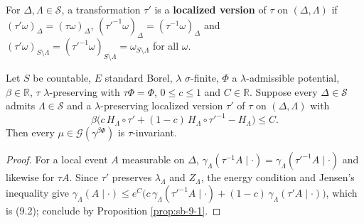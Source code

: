 \begin{definition}
    \label{def:sb-localized}
    \leanok

    For $\Delta, \Lambda \in \mathcal S$, a transformation $\tau'$ is a \textbf{localized version}
    of $\tau$ on $(\Delta, \Lambda)$ if $(\tau'\omega)_\Delta = (\tau\omega)_\Delta$,
    $(\tau'^{-1}\omega)_\Delta = (\tau^{-1}\omega)_\Delta$ and
    $(\tau'\omega)_{S \setminus \Lambda} = (\tau'^{-1}\omega)_{S \setminus \Lambda}
    = \omega_{S \setminus \Lambda}$ for all $\omega$.
\end{definition}

\begin{theorem}[Georgii (9.3)]
    \label{thm:sb-9-3}
    \leanok

    Let $S$ be countable, $E$ standard Borel, $\lambda$ $\sigma$-finite, $\Phi$ a
    $\lambda$-admissible potential, $\beta \in \mathbb R$, $\tau$ $\lambda$-preserving with
    $\tau\Phi = \Phi$, $0 \leq c \leq 1$ and $C \in \mathbb R$. Suppose every $\Delta \in \mathcal S$
    admits $\Lambda \in \mathcal S$ and a $\lambda$-preserving localized version $\tau'$ of
    $\tau$ on $(\Delta, \Lambda)$ with
    \[
        \beta\bigl(c\, H_\Lambda \circ \tau' + (1-c)\, H_\Lambda \circ \tau'^{-1} - H_\Lambda\bigr)
        \leq C .
    \]
    Then every $\mu \in \mathcal G(\gamma^{\beta\Phi})$ is $\tau$-invariant.
\end{theorem}
\begin{proof}
    \leanok
    For a local event $A$ measurable on $\Delta$, $\gamma_\Lambda(\tau^{-1}A \mid \cdot)
    = \gamma_\Lambda(\tau'^{-1}A \mid \cdot)$ and likewise for $\tau A$. Since $\tau'$ preserves
    $\lambda_\Lambda$ and $Z_\Lambda$, the energy condition and Jensen's inequality give
    $\gamma_\Lambda(A \mid \cdot) \leq e^{C}\bigl(c\,\gamma_\Lambda(\tau'^{-1}A \mid \cdot)
    + (1-c)\,\gamma_\Lambda(\tau' A \mid \cdot)\bigr)$, which is (9.2); conclude by Proposition
    \ref{prop:sb-9-1}.
\end{proof}


